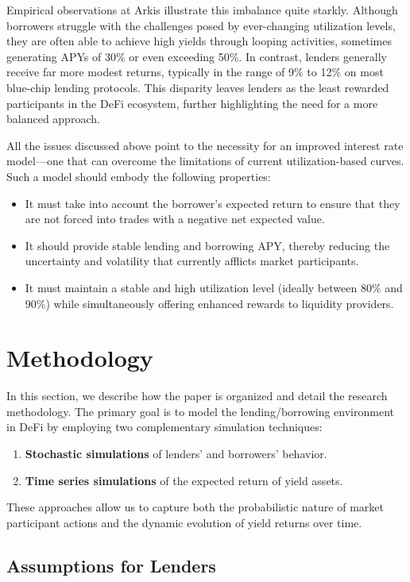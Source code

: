 \documentclass[12pt]{article}
\begin{document}
Empirical observations at Arkis illustrate this imbalance quite starkly. Although borrowers struggle with the challenges posed by ever-changing utilization levels, they are often able to achieve high yields through looping activities, sometimes generating APYs of 30\% or even exceeding 50\%. In contrast, lenders generally receive far more modest returns, typically in the range of 9\% to 12\% on most blue-chip lending protocols. This disparity leaves lenders as the least rewarded participants in the DeFi ecosystem, further highlighting the need for a more balanced approach.

All the issues discussed above point to the necessity for an improved interest rate model—one that can overcome the limitations of current utilization-based curves. Such a model should embody the following properties:
\begin{itemize}
    \item It must take into account the borrower’s expected return to ensure that they are not forced into trades with a negative net expected value.
    \item It should provide stable lending and borrowing APY, thereby reducing the uncertainty and volatility that currently afflicts market participants.
    \item It must maintain a stable and high utilization level (ideally between 80\% and 90\%) while simultaneously offering enhanced rewards to liquidity providers.
\end{itemize}

\section{Methodology}

In this section, we describe how the paper is organized and detail the research methodology. The primary goal is to model the lending/borrowing environment in DeFi by employing two complementary simulation techniques:
\begin{enumerate}
    \item \textbf{Stochastic simulations} of lenders' and borrowers' behavior.
    \item \textbf{Time series simulations} of the expected return of yield assets.
\end{enumerate}
These approaches allow us to capture both the probabilistic nature of market participant actions and the dynamic evolution of yield returns over time.

\subsection{Assumptions for Lenders}
\end{document}
